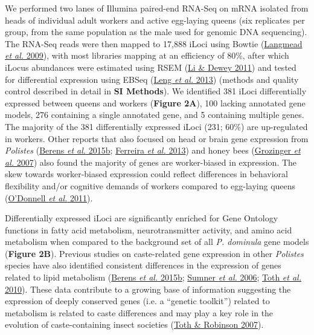 We performed two lanes of Illumina paired-end RNA-Seq on mRNA isolated
from heads of individual adult workers and active egg-laying queens (six
replicates per group, from the same population as the male used for
genomic DNA sequencing). The RNA-Seq reads were then mapped to 17,888
iLoci using Bowtie (\protect\hyperlink{ux5fENREFux5f29}{Langmead
\textit{et al.} 2009}), with most libraries mapping at an efficiency of
80\%, after which iLocus abundances were estimated using RSEM
(\protect\hyperlink{ux5fENREFux5f31}{Li \& Dewey 2011}) and tested for
differential expression using EBSeq
(\protect\hyperlink{ux5fENREFux5f30}{Leng \textit{et al.} 2013}) (methods
and quality control described in detail in \textbf{SI Methods}). We
identified 381 iLoci differentially expressed between queens and workers
(\textbf{Figure 2A}), 100 lacking annotated gene models, 276 containing
a single annotated gene, and 5 containing multiple genes. The majority
of the 381 differentially expressed iLoci (231; 60\%) are up-regulated
in workers. Other reports that also focused on head or brain gene
expression from \textit{Polistes}
(\protect\hyperlink{ux5fENREFux5f3}{Berens \textit{et al.} 2015b};
\protect\hyperlink{ux5fENREFux5f10}{Ferreira \textit{et al.} 2013}) and
honey bees (\protect\hyperlink{ux5fENREFux5f16}{Grozinger \textit{et al.}
2007}) also found the majority of genes are worker-biased in expression.
The skew towards worker-biased expression could reflect differences in
behavioral flexibility and/or cognitive demands of workers compared to
egg-laying queens (\protect\hyperlink{ux5fENREFux5f38}{O'Donnell
\textit{et al.} 2011}).

Differentially expressed iLoci are significantly enriched for Gene
Ontology functions in fatty acid metabolism, neurotransmitter activity,
and amino acid metabolism when compared to the background set of all
\textit{P. dominula} gene models (\textbf{Figure 2B}). Previous studies on
caste-related gene expression in other \textit{Polistes} species have also
identified consistent differences in the expression of genes related to
lipid metabolism (\protect\hyperlink{ux5fENREFux5f3}{Berens \textit{et
al.} 2015b}; \protect\hyperlink{ux5fENREFux5f59}{Sumner \textit{et al.}
2006}; \protect\hyperlink{ux5fENREFux5f62}{Toth \textit{et al.} 2010}).
These data contribute to a growing base of information suggesting the
expression of deeply conserved genes (i.e. a ``genetic toolkit'')
related to metabolism is related to caste differences and may play a key
role in the evolution of caste-containing insect societies
(\protect\hyperlink{ux5fENREFux5f61}{Toth \& Robinson 2007}).

